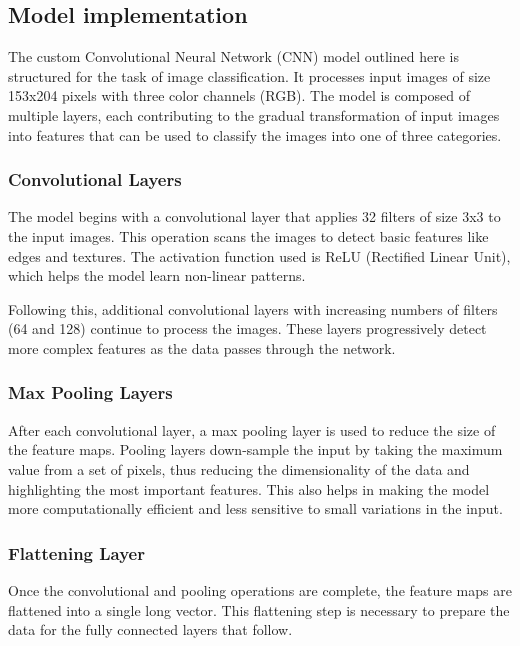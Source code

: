 \documentclass{article}
\begin{document}
    \subsection{Model implementation}

        The custom Convolutional Neural Network (CNN) model outlined here is structured for the task of image classification. It processes input images of size 153x204 pixels with three color channels (RGB). The model is composed of multiple layers, each contributing to the gradual transformation of input images into features that can be used to classify the images into one of three categories.
            
            \subsubsection{Convolutional Layers}
                The model begins with a convolutional layer that applies 32 filters of size 3x3 to the input images. This operation scans the images to detect basic features like edges and textures. The activation function used is ReLU (Rectified Linear Unit), which helps the model learn non-linear patterns.
                
                Following this, additional convolutional layers with increasing numbers of filters (64 and 128) continue to process the images. These layers progressively detect more complex features as the data passes through the network.

            \subsubsection{Max Pooling Layers}

                After each convolutional layer, a max pooling layer is used to reduce the size of the feature maps. Pooling layers down-sample the input by taking the maximum value from a set of pixels, thus reducing the dimensionality of the data and highlighting the most important features. This also helps in making the model more computationally efficient and less sensitive to small variations in the input.
                
            \subsubsection{Flattening Layer}

                Once the convolutional and pooling operations are complete, the feature maps are flattened into a single long vector. This flattening step is necessary to prepare the data for the fully connected layers that follow.
                
\end{document}
